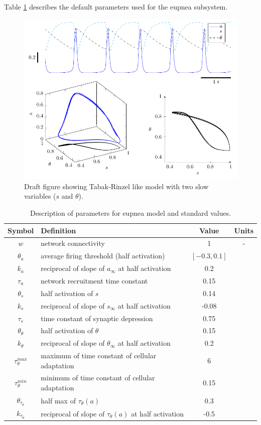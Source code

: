 \documentclass[12pt]{article}
\def\ainf{a_\infty}
\def\sinf{s_\infty}
\def\thetainf{\theta_\infty}
\def\tautheta{\tau_\theta}
\def\tauthetamax{\tau_\theta^{max}}
\def\tauthetamin{\tau_\theta^{min}}
\def\thetatheta{\theta_\theta}
\def\thetatautheta{\theta_{\tautheta}}
\def\ktautheta{k_{\tautheta}}
\begin{document}
Table \ref{ParamDefEupnea} describes the default parameters used for the eupnea subsystem. 

\begin{figure}
\centering 
\includegraphics[width=\textwidth]{Fig02TabakRinzelTwoVarRepresentative}
\caption{Draft figure showing Tabak-Rinzel like model with two slow variables ($s$ and $\theta$). }
\label{TabakRinzelTwoVarRepresentative}
\end{figure}

\begin{table}[h!]
\centering 
\begin{tabular}{clcc}
    Symbol & Definition & Value  & Units \\
\hline 
\hline
$w$ & network connectivity & 1 &  - \\
\hline 
\hline 
$\theta_a$ & average firing threshold  (half activation) &  $[-0.3,0.1]$ & \\
$k_a$ & reciprocal of slope of $\ainf$ at half activation  & 0.2 &  \\
$\tau_a$ & network recruitment time constant  & 0.15  & \\
\hline 
$\theta_s$ & half activation of $s$ & 0.14 &  \\
$k_s$ & reciprocal of slope of $\sinf$ at half activation  & -0.08 &  \\
$\tau_s$ & time constant of synaptic depression   & 0.75 &  \\
\hline 
$\thetatheta$ & half activation of $\theta$ & 0.15 &  \\
$k_\theta$ & reciprocal of slope of $\thetainf$ at half activation  & 0.2 &  \\
\hline 
$\tauthetamax$ & maximum of time constant of cellular adaptation   & 6 &  \\
$\tauthetamin$ &  minimum of time constant of cellular adaptation   & 0.15 & \\
$\thetatautheta$ & half max of $\tautheta(a)$  & 0.3 &  \\
$\ktautheta$ & reciprocal of slope of $\tautheta(a)$ at half activation  & -0.5&   \\
    \hline 
    \hline
\end{tabular}
\caption{Description of parameters for eupnea model and standard values.}
\label{ParamDefEupnea}
\end{table}
\end{document}
